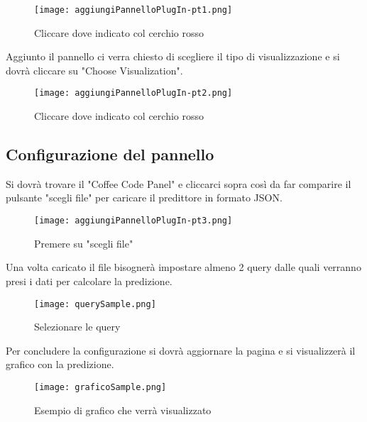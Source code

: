 \documentclass[../manuale-utente.tex]{subfiles}
\begin{document}
\begin{figure}[h!]
  \begin{center}
    \texttt{[image: aggiungiPannelloPlugIn-pt1.png]}\\
    \caption{Cliccare dove indicato col cerchio rosso}%
    \label{fig:aggiungi-pannello}
  \end{center}
\end{figure}

Aggiunto il pannello ci verra chiesto di scegliere il tipo di visualizzazione e si dovrà cliccare su "Choose Visualization".

\begin{figure}[h!]
  \begin{center}
    \texttt{[image: aggiungiPannelloPlugIn-pt2.png]}\\
    \caption{Cliccare dove indicato col cerchio rosso}%
    \label{fig:scegliere-la-visualizzazione}
  \end{center}
\end{figure}

\newpage
\subsection{Configurazione del pannello}

Si dovrà trovare il "Coffee Code Panel" e cliccarci sopra così da far comparire il pulsante "scegli file" per caricare il predittore in formato JSON.

\begin{figure}[h!]
    \begin{center}
      \texttt{[image: aggiungiPannelloPlugIn-pt3.png]}\\
      \caption{Premere su "scegli file"}%
      \label{fig:scelta-del-file}
    \end{center}
  \end{figure}

Una volta caricato il file bisognerà impostare almeno 2 query dalle quali verranno presi i dati per calcolare la predizione.

\begin{figure}[h!]
    \begin{center}
      \texttt{[image: querySample.png]}\\
      \caption{Selezionare le query}%
      \label{fig:selezionare-le-query}
    \end{center}
  \end{figure}
  \newpage
Per concludere la configurazione si dovrà aggiornare la pagina e si visualizzerà il grafico con la predizione.

\begin{figure}[h!]
    \begin{center}
      \texttt{[image: graficoSample.png]}\\
      \caption{Esempio di grafico che verrà visualizzato}%
      \label{fig:esempio-grafico}
    \end{center}
  \end{figure}
\end{document}
